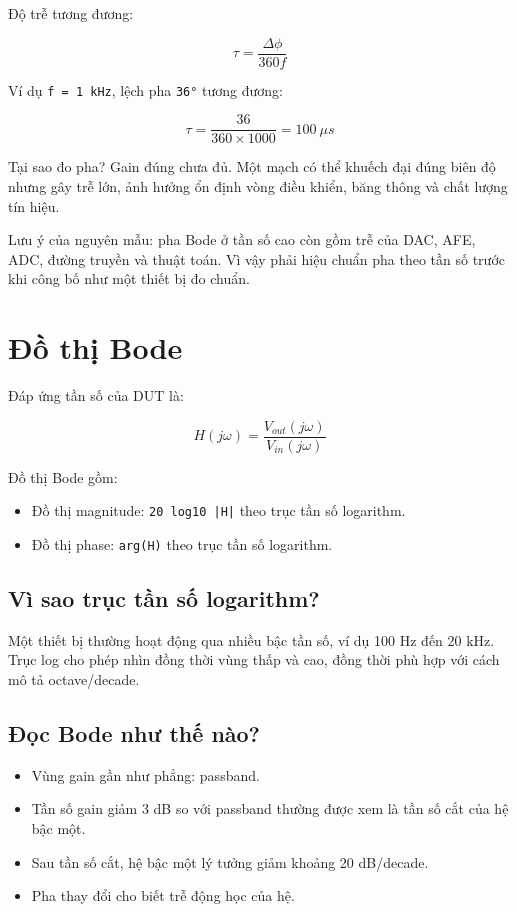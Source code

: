 \documentclass[12pt,a4paper,oneside]{article}
\newcommand{\inlinecode}[1]{\texttt{#1}}
\begin{document}
Độ trễ tương đương:

\[
\tau=\frac{\Delta\phi}{360f}
\]

Ví dụ \inlinecode{f = 1 kHz}, lệch pha \inlinecode{36°} tương đương:

\[
\tau=\frac{36}{360\times1000}=100\ \mu s
\]

Tại sao đo pha? Gain đúng chưa đủ. Một mạch có thể khuếch đại đúng biên độ nhưng gây trễ lớn, ảnh hưởng ổn định vòng điều khiển, băng thông và chất lượng tín hiệu.

Lưu ý của nguyên mẫu: pha Bode ở tần số cao còn gồm trễ của DAC, AFE, ADC, đường truyền và thuật toán. Vì vậy phải hiệu chuẩn pha theo tần số trước khi công bố như một thiết bị đo chuẩn.

\section{Đồ thị Bode}

Đáp ứng tần số của DUT là:

\[
H(j\omega)=\frac{V_{out}(j\omega)}{V_{in}(j\omega)}
\]

Đồ thị Bode gồm:

\begin{itemize}
\item Đồ thị magnitude: \inlinecode{20 log10 |H|} theo trục tần số logarithm.
\item Đồ thị phase: \inlinecode{arg(H)} theo trục tần số logarithm.
\end{itemize}

\subsection{Vì sao trục tần số logarithm?}

Một thiết bị thường hoạt động qua nhiều bậc tần số, ví dụ 100 Hz đến 20 kHz. Trục log cho phép nhìn đồng thời vùng thấp và cao, đồng thời phù hợp với cách mô tả octave/decade.

\subsection{Đọc Bode như thế nào?}

\begin{itemize}
\item Vùng gain gần như phẳng: passband.
\item Tần số gain giảm 3 dB so với passband thường được xem là tần số cắt của hệ bậc một.
\item Sau tần số cắt, hệ bậc một lý tưởng giảm khoảng 20 dB/decade.
\item Pha thay đổi cho biết trễ động học của hệ.
\end{itemize}
\end{document}
